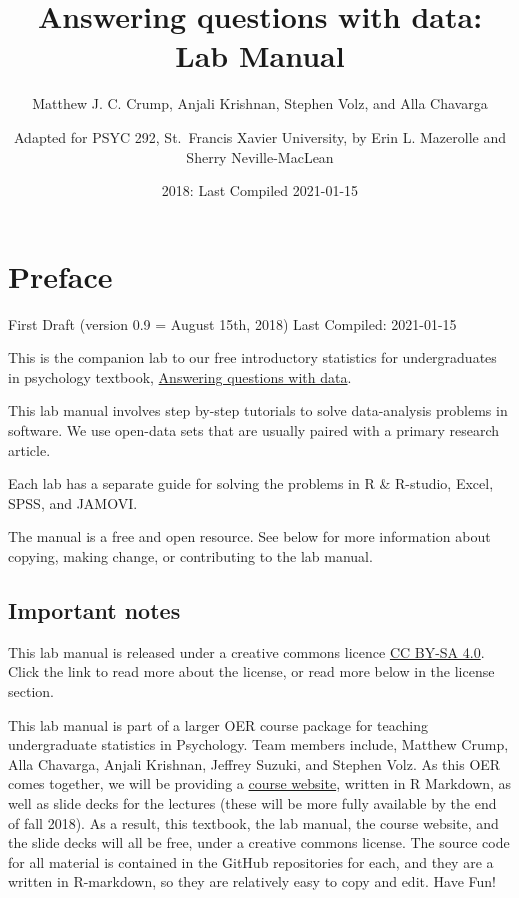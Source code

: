 \documentclass[]{book}
\title{Answering questions with data: Lab Manual}
\author{Matthew J. C. Crump, Anjali Krishnan, Stephen Volz, and Alla Chavarga \and Adapted for PSYC 292, St.~Francis Xavier University, by Erin L.
Mazerolle and Sherry Neville-MacLean}
\date{2018: Last Compiled 2021-01-15}
\begin{document}
\maketitle

{
\setcounter{tocdepth}{1}
\tableofcontents
}
\chapter*{Preface}\label{preface}

First Draft (version 0.9 = August 15th, 2018) Last Compiled: 2021-01-15

This is the companion lab to our free introductory statistics for
undergraduates in psychology textbook,
\href{https://crumplab.github.io/statistics/}{Answering questions with
data}.

This lab manual involves step by-step tutorials to solve data-analysis
problems in software. We use open-data sets that are usually paired with
a primary research article.

Each lab has a separate guide for solving the problems in R \& R-studio,
Excel, SPSS, and JAMOVI.

The manual is a free and open resource. See below for more information
about copying, making change, or contributing to the lab manual.

\section{Important notes}\label{important-notes}

This lab manual is released under a creative commons licence
\href{https://creativecommons.org/licenses/by-sa/4.0/}{CC BY-SA 4.0}.
Click the link to read more about the license, or read more below in the
license section.

This lab manual is part of a larger OER course package for teaching
undergraduate statistics in Psychology. Team members include, Matthew
Crump, Alla Chavarga, Anjali Krishnan, Jeffrey Suzuki, and Stephen Volz.
As this OER comes together, we will be providing a
\href{https://crumplab.github.io/psyc3400/}{course website}, written in
R Markdown, as well as slide decks for the lectures (these will be more
fully available by the end of fall 2018). As a result, this textbook,
the lab manual, the course website, and the slide decks will all be
free, under a creative commons license. The source code for all material
is contained in the GitHub repositories for each, and they are a written
in R-markdown, so they are relatively easy to copy and edit. Have Fun!
\end{document}

